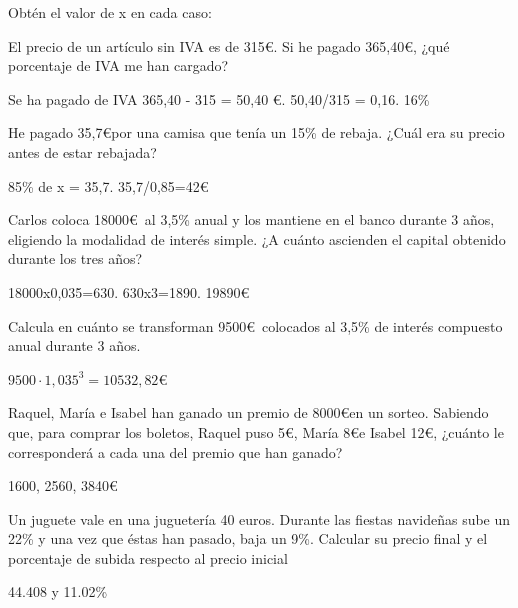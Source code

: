 \documentclass[addpoints,spanish, 12pt,a4paper]{exam}
\begin{document}
\begin{questions}

\question Obtén el valor de x en cada caso:
\addpoints


\question  El precio de un artículo sin IVA es de 315\euro. Si he pagado 365,40\euro, ¿qué porcentaje de IVA me han cargado?
\begin{solution}
Se ha pagado de IVA 365,40 - 315 = 50,40 \euro. 50,40/315 = 0,16. 16\%
\end{solution}

\question  He pagado 35,7\euro por una camisa que tenía un 15\% de rebaja. ¿Cuál era su precio antes de estar rebajada?
\begin{solution}
85\% de x = 35,7. 35,7/0,85=42\euro
\end{solution}

\question  Carlos coloca 18000\euro \   al 3,5\% anual y los mantiene en el banco durante 3 años, eligiendo la modalidad de interés simple. ¿A cuánto ascienden el capital obtenido durante los tres años?
\begin{solution}
18000x0,035=630. 630x3=1890. 19890\euro
\end{solution}


\question  Calcula en cuánto se transforman 9500\euro \ colocados al 3,5\% de interés compuesto anual durante 3 años.
\begin{solution}
$9500\cdot1,035^3=10532,82$\euro
\end{solution}

\question  Raquel, María e Isabel han ganado un premio de 8000\euro en un sorteo. Sabiendo que, para comprar los boletos, Raquel puso 5\euro, María 8\euro e Isabel 12\euro, ¿cuánto le corresponderá a cada una del premio que han ganado?
\begin{solution}
1600, 2560, 3840\euro
\end{solution}



\question Un juguete vale en una juguetería 40 euros. Durante las fiestas navideñas sube un 22\% y una
vez que éstas han pasado, baja un 9\%. Calcular su precio final y el porcentaje de subida
respecto al precio inicial
\begin{solution}
44.408 y 11.02\%
\end{solution}


\addpoints

\end{questions}
\end{document}
